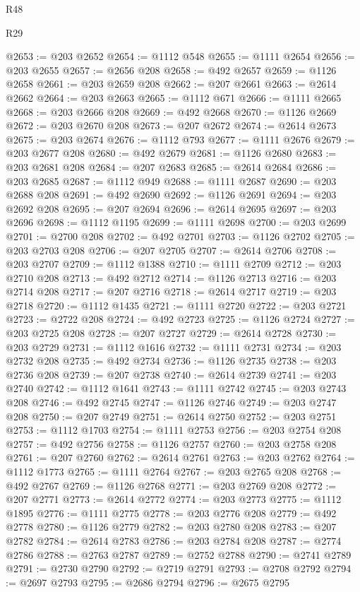 \begin{lexlean}{R48}
\begin{lexlean}{R29}
\begin{coremodule}
{{{{{{{{{{{{{{{{{{{{{{{{{{{{{{{{{{{{{{{{{{{{{{{{{{{{{{{{{{{{{{{{{{{{{{{{{{{{{{{{{{{{{{{{{{{{{{{{{{{{{{{{{{{{{{{{{{{{{{{{{{{{{{{{{{{{{{{{{{{{{{{{{{{{{{{{{{{{{{{{{{{{{{{{{{{{{{{{{{{{{{{{{{{{{{{{{{{{{{{{{{{{{{{{{{{{{{{{{{@2653 := @203 @2652
@2654 := @1112 @548
@2655 := @1111 @2654
@2656 := @203 @2655
@2657 := @2656 @208
@2658 := @492 @2657
@2659 := @1126 @2658
@2661 := @203 @2659 @208
@2662 := @207 @2661
@2663 := @2614 @2662
@2664 := @203 @2663
@2665 := @1112 @671
@2666 := @1111 @2665
@2668 := @203 @2666 @208
@2669 := @492 @2668
@2670 := @1126 @2669
@2672 := @203 @2670 @208
@2673 := @207 @2672
@2674 := @2614 @2673
@2675 := @203 @2674
@2676 := @1112 @793
@2677 := @1111 @2676
@2679 := @203 @2677 @208
@2680 := @492 @2679
@2681 := @1126 @2680
@2683 := @203 @2681 @208
@2684 := @207 @2683
@2685 := @2614 @2684
@2686 := @203 @2685
@2687 := @1112 @949
@2688 := @1111 @2687
@2690 := @203 @2688 @208
@2691 := @492 @2690
@2692 := @1126 @2691
@2694 := @203 @2692 @208
@2695 := @207 @2694
@2696 := @2614 @2695
@2697 := @203 @2696
@2698 := @1112 @1195
@2699 := @1111 @2698
@2700 := @203 @2699
@2701 := @2700 @208
@2702 := @492 @2701
@2703 := @1126 @2702
@2705 := @203 @2703 @208
@2706 := @207 @2705
@2707 := @2614 @2706
@2708 := @203 @2707
@2709 := @1112 @1388
@2710 := @1111 @2709
@2712 := @203 @2710 @208
@2713 := @492 @2712
@2714 := @1126 @2713
@2716 := @203 @2714 @208
@2717 := @207 @2716
@2718 := @2614 @2717
@2719 := @203 @2718
@2720 := @1112 @1435
@2721 := @1111 @2720
@2722 := @203 @2721
@2723 := @2722 @208
@2724 := @492 @2723
@2725 := @1126 @2724
@2727 := @203 @2725 @208
@2728 := @207 @2727
@2729 := @2614 @2728
@2730 := @203 @2729
@2731 := @1112 @1616
@2732 := @1111 @2731
@2734 := @203 @2732 @208
@2735 := @492 @2734
@2736 := @1126 @2735
@2738 := @203 @2736 @208
@2739 := @207 @2738
@2740 := @2614 @2739
@2741 := @203 @2740
@2742 := @1112 @1641
@2743 := @1111 @2742
@2745 := @203 @2743 @208
@2746 := @492 @2745
@2747 := @1126 @2746
@2749 := @203 @2747 @208
@2750 := @207 @2749
@2751 := @2614 @2750
@2752 := @203 @2751
@2753 := @1112 @1703
@2754 := @1111 @2753
@2756 := @203 @2754 @208
@2757 := @492 @2756
@2758 := @1126 @2757
@2760 := @203 @2758 @208
@2761 := @207 @2760
@2762 := @2614 @2761
@2763 := @203 @2762
@2764 := @1112 @1773
@2765 := @1111 @2764
@2767 := @203 @2765 @208
@2768 := @492 @2767
@2769 := @1126 @2768
@2771 := @203 @2769 @208
@2772 := @207 @2771
@2773 := @2614 @2772
@2774 := @203 @2773
@2775 := @1112 @1895
@2776 := @1111 @2775
@2778 := @203 @2776 @208
@2779 := @492 @2778
@2780 := @1126 @2779
@2782 := @203 @2780 @208
@2783 := @207 @2782
@2784 := @2614 @2783
@2786 := @203 @2784 @208
@2787 := @2774 @2786
@2788 := @2763 @2787
@2789 := @2752 @2788
@2790 := @2741 @2789
@2791 := @2730 @2790
@2792 := @2719 @2791
@2793 := @2708 @2792
@2794 := @2697 @2793
@2795 := @2686 @2794
@2796 := @2675 @2795
}}}}}}}}}}}}}}}}}}}}}}}}}}}}}}}}}}}}}}}}}}}}}}}}}}}}}}}}}}}}}}}}}}}}}}}}}}}}}}}}}}}}}}}}}}}}}}}}}}}}}}}}}}}}}}}}}}}}}}}}}}}}}}}}}}}}}}}}}}}}}}}}}}}}}}}}}}}}}}}}}}}}}}}}}}}}}}}}}}}}}}}}}}}}}}}}}}}}}}}}}}}}}}}}}}}}}}}}}}
\end{coremodule}
\end{lexlean}
\end{lexlean}
